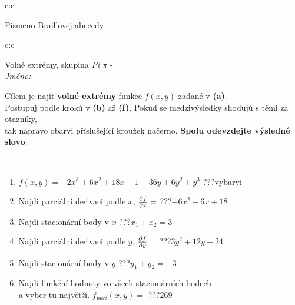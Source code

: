 \documentclass[10pt]{report}
\begin{document}
\begin{tabular}{c:c}
\begin{minipage}[c][104.5mm][t]{0.5\linewidth}
\begin{center}
\begin{minipage}{0.20\linewidth}
\begin{center}
{\small Písmeno Braillovej abecedy}
\end{center}
\end{minipage}
\end{center}
\end{minipage}
%
\end{tabular}
\newpage
\thispagestyle{empty}
\begin{tabular}{c:c}
\begin{minipage}[c][104.5mm][t]{0.5\linewidth}
\begin{center}
\vspace{7mm}
{\huge Volné extrémy, skupina \textit{Pi $\pi$} -}\\[5mm]
\textit{Jméno:}\phantom{xxxxxxxxxxxxxxxxxxxxxxxxxxxxxxxxxxxxxxxxxxxxxxxxxxxxxxxxxxxxxxxxx}\\[5mm]
\begin{minipage}{0.95\linewidth}
\begin{center}
Cílem je najít \textbf{volné extrémy} funkce $f(x,y)$ zadané v \textbf{(a)}.\\Postupuj podle krokú v \textbf{(b)} až \textbf{(f)}. Pokud se medzivýsledky shodujú s těmi za otazníky,\\tak napravo obarvi příslušející kroužek načerno. \textbf{Spolu odevzdejte výsledné slovo}.
\end{center}
\end{minipage}
\\[1mm]
\begin{minipage}{0.79\linewidth}
\begin{center}
\begin{varwidth}{\linewidth}
\begin{enumerate}
\normalsize
\item $f(x,y)=-2x^3+6x^2+18x-1-36y+6y^2+y^3$\quad \dotfill\; ???\;\dotfill \quad vybarvi
\item Najdi parciální derivaci podle $x$, $\pdv{f}{x}=$\quad \dotfill\; ???\;\dotfill \quad $-6x^2+6x+18$
\item Najdi stacionární body v $x$\quad \dotfill\; ???\;\dotfill \quad $x_1+x_2=3$
\item Najdi parciální derivaci podle $y$, $\pdv{f}{y}=$\quad \dotfill\; ???\;\dotfill \quad $3y^2+12y-24$
\item Najdi stacionární body v $y$\quad \dotfill\; ???\;\dotfill \quad $y_1+y_2=-3$
\item Najdi funkční hodnoty vo všech stacionárních bodech \\ \phantom{xxxxxx} a vyber tu najvětší. $f_{\text{max}}(x,y)=$\quad \dotfill\; ???\;\dotfill \quad $269$

\end{enumerate}
\end{varwidth}
\end{center}
\end{minipage}
\end{center}
\end{minipage}
\end{tabular}
\end{document}
